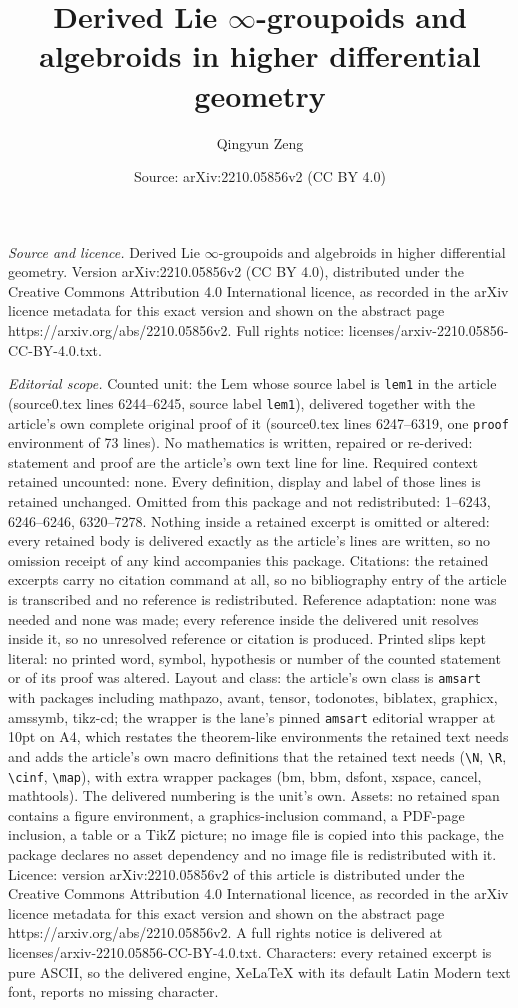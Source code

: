 \documentclass[10pt,a4paper]{amsart}
\title[Derived Lie $\infty$-groupoids and algebroids in higher diff]{Derived Lie $\infty$-groupoids and algebroids in higher differential geometry}
\author{Qingyun Zeng}
\date{Source: arXiv:2210.05856v2 (CC BY 4.0)}
\begin{document}
\maketitle

\noindent\emph{Source and licence.} Derived Lie $\infty$-groupoids and algebroids in higher differential geometry. Version arXiv:2210.05856v2 (CC BY 4.0), distributed under the Creative Commons Attribution 4.0 International licence, as recorded in the arXiv licence metadata for this exact version and shown on the abstract page https://arxiv.org/abs/2210.05856v2. Full rights notice: licenses/arxiv-2210.05856-CC-BY-4.0.txt.\par\smallskip

\noindent\textit{Editorial scope.} Counted unit: the Lem whose source label is \texttt{lem1} in the article (source0.tex lines 6244--6245, source label \texttt{lem1}), delivered together with the article's own complete original proof of it (source0.tex lines 6247--6319, one \texttt{proof} environment of 73 lines). No mathematics is written, repaired or re-derived: statement and proof are the article's own text line for line. Required context retained uncounted: none. Every definition, display and label of those lines is retained unchanged. Omitted from this package and not redistributed: 1--6243, 6246--6246, 6320--7278. Nothing inside a retained excerpt is omitted or altered: every retained body is delivered exactly as the article's lines are written, so no omission receipt of any kind accompanies this package. Citations: the retained excerpts carry no citation command at all, so no bibliography entry of the article is transcribed and no reference is redistributed. Reference adaptation: none was needed and none was made; every reference inside the delivered unit resolves inside it, so no unresolved reference or citation is produced. Printed slips kept literal: no printed word, symbol, hypothesis or number of the counted statement or of its proof was altered. Layout and class: the article's own class is \texttt{amsart} with packages including mathpazo, avant, tensor, todonotes, biblatex, graphicx, amssymb, tikz-cd; the wrapper is the lane's pinned \texttt{amsart} editorial wrapper at 10pt on A4, which restates the theorem-like environments the retained text needs and adds the article's own macro definitions that the retained text needs (\texttt{\textbackslash N}, \texttt{\textbackslash R}, \texttt{\textbackslash cinf}, \texttt{\textbackslash map}), with extra wrapper packages (bm, bbm, dsfont, xspace, cancel, mathtools). The delivered numbering is the unit's own. Assets: no retained span contains a figure environment, a graphics-inclusion command, a PDF-page inclusion, a table or a TikZ picture; no image file is copied into this package, the package declares no asset dependency and no image file is redistributed with it. Licence: version arXiv:2210.05856v2 of this article is distributed under the Creative Commons Attribution 4.0 International licence, as recorded in the arXiv licence metadata for this exact version and shown on the abstract page https://arxiv.org/abs/2210.05856v2. A full rights notice is delivered at licenses/arxiv-2210.05856-CC-BY-4.0.txt. Characters: every retained excerpt is pure ASCII, so the delivered engine, XeLaTeX with its default Latin Modern text font, reports no missing character.
\end{document}
